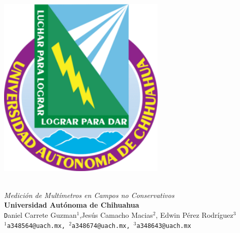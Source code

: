 \documentclass[a0,portrait]{a0poster}
\begin{document}
\renewcommand\abstractname{\Large{}}

   
\begin{minipage}[ht]{0.20\linewidth}
    \includegraphics[width=8cm]{Escudo_UACH.png}\\
\end{minipage}
\begin{minipage}[ht]{0.67\linewidth}
\veryHuge \color{NavyBlue} \textbf{} \color{Black}\\ %
\Huge\textit{Medición de Multímetros en Campos no Conservativos}\\[2cm] %
\huge \textbf{Universidad Autónoma de Chihuahua}\\[0.4cm] %
\Large \texttt Daniel Carrete Guzman$^{1}$,Jesús Camacho Macias$^{2}$, Edwin Pérez Rodríguez$^{3}$\\[0.3cm] %
\texttt{$^{1}$a348564@uach.mx, $^{2}$a348674@uach.mx, $^{3}$a348643@uach.mx \\}
\end{minipage}
\end{document}
